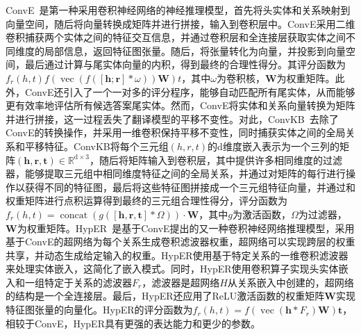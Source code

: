 \documentclass[algorithmlist, AutoFakeBold, AutoFakeSlant, figurelist, tablelist, nomlist, masters]{seuthesix}
\begin{document}
ConvE~\cite{dettmers2018convolutional}是第一种采用卷积神经网络的神经推理模型，首先将头实体和关系映射到向量空间，随后将向量转换成矩阵并进行拼接，输入到卷积层中。ConvE采用二维卷积捕获两个实体之间的特征交互信息，并通过卷积层和全连接层获取实体之间不同维度的局部信息，返回特征图张量。随后，将张量转化为向量，并投影到向量空间，最后通过计算与尾实体向量的内积，得到最终的合理性得分。其评分函数为$f_r\left(h, t\right)f(\operatorname{vec}(f([\bm{h} ; \bm{r}] * \omega)) \mathbf{W}) t$，其中$\omega$为卷积核，$\mathbf{W}$为权重矩阵。此外，ConvE还引入了一个一对多的评分程序，能够自动匹配所有尾实体，从而能够更有效率地评估所有候选答案尾实体。然而，ConvE将实体和关系向量转换为矩阵并进行拼接，这一过程丢失了翻译模型的平移不变性。对此，ConvKB~\cite{nguyen2018novel}去除了ConvE的转换操作，并采用一维卷积保持平移不变性，同时捕获实体之间的全局关系和平移特征。ConvKB将每个三元组$\left(h, r, t\right)$的d维度嵌入表示为一个三列的矩阵$(\bm{h}, \bm{r}, \bm{t}) \in \mathbb{R}^{\mathrm{d} \times 3}$，随后将矩阵输入到卷积层，其中提供许多相同维度的过滤器，能够提取三元组中相同维度特征之间的全局关系，并通过对矩阵的每行进行操作以获得不同的特征图，最后将这些特征图拼接成一个三元组特征向量，并通过和权重矩阵进行点积运算得到最终的三元组合理性得分，评分函数为$f_r(h, t)=\operatorname{concat}(g([\bm{h}, \bm{r}, \bm{t}] * \Omega)) \cdot \mathbf{W}$，其中$g$为激活函数，$\Omega$为过滤器，$\mathbf{W}$为权重矩阵。HypER~\cite{balazevic2019hypernetwork}是基于ConvE提出的又一种卷积神经网络推理模型，采用基于ConvE的超网络为每个关系生成卷积滤波器权重，超网络可以实现跨层的权重共享，并动态生成给定输入的权重。HypER使用基于特定关系的一维卷积滤波器来处理实体嵌入，这简化了嵌入模式。同时，HypER使用卷积算子实现头实体嵌入和一组特定于关系的滤波器$F_r$，滤波器是超网络$H$从关系嵌入中创建的，超网络的结构是一个全连接层。最后，HypER还应用了ReLU激活函数的权重矩阵$\mathbf{W}$实现特征图张量的向量化。HypER的评分函数为$f_r(h, t)=f\left(\operatorname{vec}\left(\bm{h} * F_r\right) \mathbf{W}\right) \bm{t}$，相较于ConvE，HypER具有更强的表达能力和更少的参数。
\end{document}
